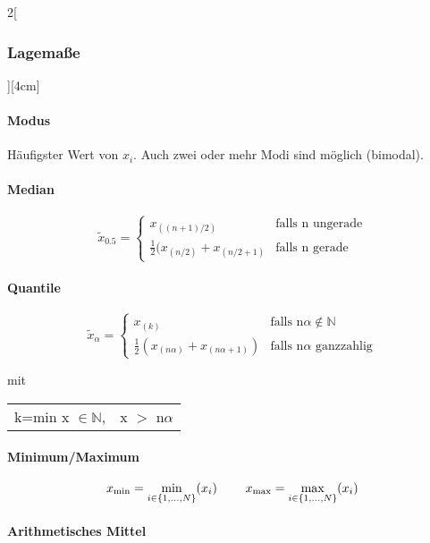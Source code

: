 \documentclass[8pt]{extarticle}
\begin{document}
\begin{multicols}{2}[\subsubsection{Lagemaße}][4cm] 

\paragraph{Modus}

 Häufigster Wert von $x_i$. Auch zwei oder mehr Modi sind möglich (bimodal).

\paragraph{Median}

$$\tilde{x}_{0.5}=\begin{cases} x_{((n+1)/2)} & \text{falls n ungerade} \\ \frac{1}{2}(x_{(n/2)}+x_{(n/2+1)} & \text{falls n gerade} \end{cases}$$

\paragraph{Quantile}

$$\tilde{x}_\alpha=\begin{cases} x_{(k)} & \text{falls n}\alpha \notin \mathbb{N}\\ \frac{1}{2}(x_{(n\alpha)}+ x_{(n\alpha+1)}) & \text{falls n}\alpha \text{ ganzzahlig} \end{cases}$$

mit

\begin{tabular}{l l}
 k=min x $\in \mathbb{N}$, &  x $>$ n$\alpha$ \\
\end{tabular}

\paragraph{Minimum/Maximum}


$$x_{\min}=\min_{i \in \{ 1,...,N\}} (x_i) \hspace{0.8cm}   x_{\max}=\max_{i \in \{ 1,...,N\}} (x_i)$$
 


\paragraph{Arithmetisches Mittel}


\end{multicols}
\end{document}
